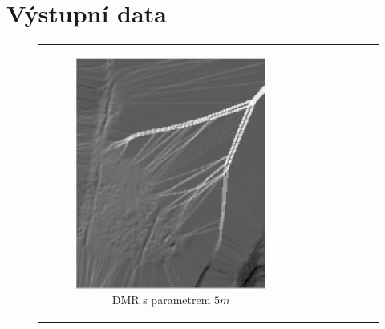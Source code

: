 \section{Výstupní data}
\begin{figure}[H]
    \centering
    \begin{tabular}{cc} %
        \begin{subfigure}[b]{0.35\textwidth}
            \centering
            \includegraphics[width=\textwidth]{images/IM_5m.png}
            \caption{DMR s parametrem $5 m$}
        \end{subfigure} &
        \begin{subfigure}[b]{0.35\textwidth}
            \centering

\end{subfigure}
\end{tabular}
\end{figure}
